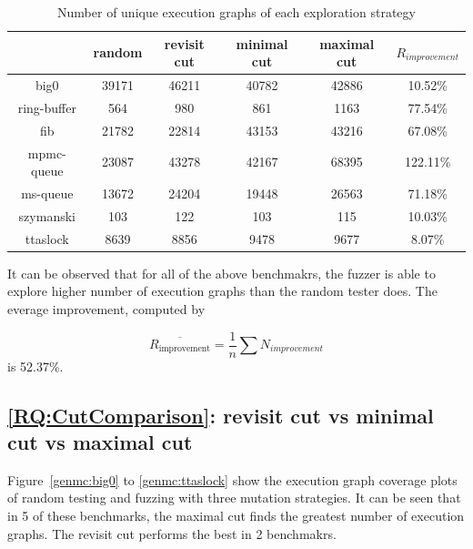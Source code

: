 \begin{table}[h!]
	\centering
	\begin{tabular}{|c|cccc|c|}
		\hline
		\diagbox{Benchmark}{ Strategy} & random & revisit cut & minimal cut & maximal cut & $R_{improvement}$ \\ \hline
		big0                           & 39171  & 46211       & 40782       & 42886       & 10.52\%           \\ \hline
		ring-buffer                    & 564    & 980         & 861         & 1163        & 77.54\%           \\ \hline
		fib                            & 21782  & 22814       & 43153       & 43216       & 67.08\%           \\ \hline
		mpmc-queue                     & 23087  & 43278       & 42167       & 68395       & 122.11\%          \\ \hline
		ms-queue                       & 13672  & 24204       & 19448       & 26563       & 71.18\%           \\ \hline
		szymanski                      & 103    & 122         & 103         & 115         & 10.03\%           \\ \hline
		ttaslock                       & 8639   & 8856        & 9478        & 9677        & 8.07\%            \\ \hline
	\end{tabular}
	\label{genmc:num-of-exe}
	\caption{Number of unique execution graphs of each exploration strategy}
\end{table}

It can be observed that for all of the above benchmakrs, the fuzzer is able to explore higher number of execution graphs than the random tester does. The everage improvement, computed by


\[
	\overline{R_{\text{improvement}}} = \frac{1}{n} \sum N_{improvement}
\]
is 52.37\%.

\subsection{\ref*{RQ:CutComparison}: revisit cut vs minimal cut vs maximal cut }

Figure~\ref{genmc:big0} to \ref{genmc:ttaslock} show the execution graph coverage plots of random testing and fuzzing with three mutation strategies. It can be seen that in 5 of these benchmarks, the maximal cut finds the greatest number of execution graphs. The revisit cut performs the best in 2 benchmakrs.

